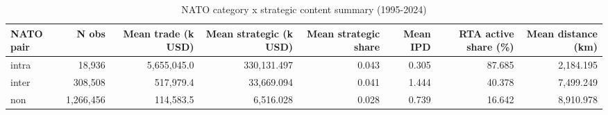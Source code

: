 \begin{table}[!h]
\centering
\caption{\label{tab:tab:nato_strategic}NATO category x strategic content summary (1995-2024)}
\centering
\begin{tabular}[t]{lrrrrrrr}
\toprule
NATO pair & N obs & Mean trade (k USD) & Mean strategic (k USD) & Mean strategic share & Mean IPD & RTA active share (\%) & Mean distance (km)\\
\midrule
intra & 18,936 & 5,655,045.0 & 330,131.497 & 0.043 & 0.305 & 87.685 & 2,184.195\\
inter & 308,508 & 517,979.4 & 33,669.094 & 0.041 & 1.444 & 40.378 & 7,499.249\\
non & 1,266,456 & 114,583.5 & 6,516.028 & 0.028 & 0.739 & 16.642 & 8,910.978\\
\bottomrule
\end{tabular}
\end{table}
